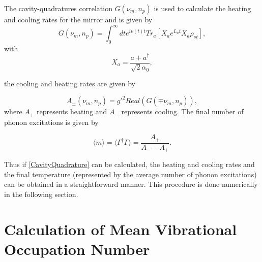 \documentclass[reprint, amsmath,amssymb, aps,pra]{revtex4-1}
\begin{document}
The cavity-quadratures correlation $G(\nu_m,n_p)$ is used to calculate
the heating and cooling rates for the mirror and is given by
\begin{equation} \label{CavityQuadrature}
G(\nu_m,n_p) = \int_0^\infty dt e^{i\nu(t) t}Tr_a[X_a e^{L_a t} X_a \rho_{st}],
\end{equation} with 
\begin{equation}
X_a = \frac{a + a^\dagger}{\sqrt{2}\alpha_0},
\end{equation}

the cooling and heating rates are given by


\begin{equation}
A_\pm(\nu_m,n_p) = g'^2Real(G(\mp \nu_m,n_p)),
\end{equation} where $A_+$ represents heating and $A_-$ represents cooling. The final number of phonon excitations is given by

\begin{equation}
\langle m \rangle =\langle \Gamma^\dagger \Gamma \rangle = \frac{A_+}{A_- - A_+}.
\end{equation}

Thus if \eqref{CavityQuadrature} can be calculated, the heating and
cooling rates and the final temperature (represented by the
average number of phonon excitations) can be obtained in a
straightforward manner. This procedure is done numerically in the
following section.

\section{Calculation of Mean Vibrational Occupation Number}\label{NumCal}
\end{document}
